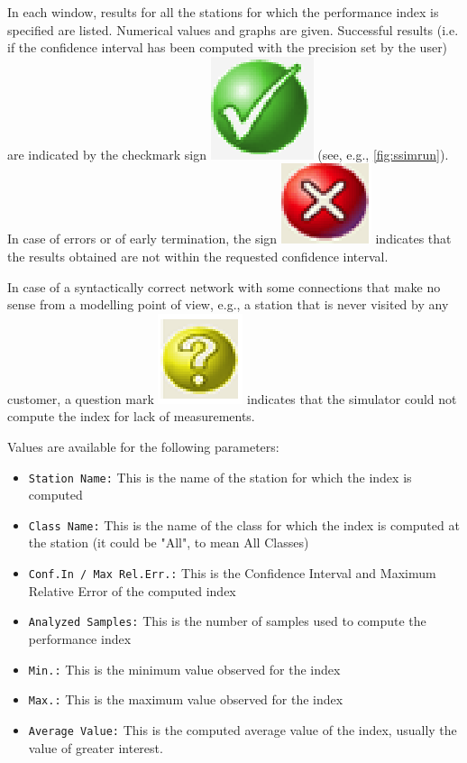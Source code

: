 In each window, results for all the stations for which the
performance index is specified are listed. Numerical values and
graphs are given. Successful results (i.e. if the confidence
interval has been computed with the precision set by the user) are
indicated by the checkmark sign \includegraphics[scale=.3]
{img/jsimg/tick} (see, e.g.,
\autoref{fig:ssimrun}). In case of errors or of early
termination, the sign \includegraphics[scale=.3]
{img/jsimg/cross2} indicates that the
results obtained are not within the requested confidence interval.

In case of a syntactically correct network with some connections
that make no sense from a modelling point of view, e.g., a station
that is never visited by any customer, a question mark \includegraphics[scale=.3]{img/jsimg/question}
indicates that the simulator could not
compute the index for lack of measurements.

Values are available for the following parameters:
\begin{itemize}

\item \texttt{Station Name:} This is the name of the station for
which the index is computed \item \texttt{Class Name:} This is the
name of the class for which the index is computed at the station
(it could be "All", to mean All Classes) \item \texttt{Conf.In /
Max Rel.Err.:} This is the Confidence Interval and Maximum
Relative Error of the computed index \item \texttt{Analyzed
Samples:} This is the number of samples used to compute the
performance index \item  \texttt{Min.:} This is the minimum value
observed for the index \item \texttt{Max.:} This is the maximum
value observed for the index \item \texttt{Average Value:} This is
the computed average value of the index, usually the value of
greater interest.
\end{itemize}


